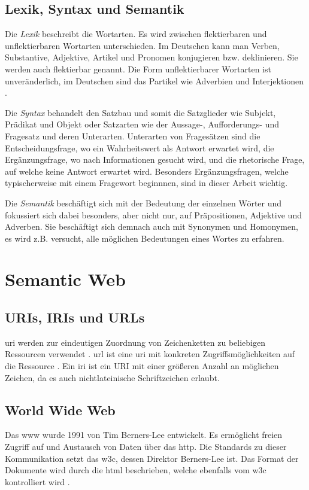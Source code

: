 \subsection{Lexik, Syntax und Semantik}
Die \emph{Lexik} beschreibt die Wortarten.
Es wird zwischen flektierbaren und unflektierbaren Wortarten unterschieden.
Im Deutschen kann man Verben, Substantive, Adjektive, Artikel und Pronomen konjugieren bzw. deklinieren.
Sie werden auch flektierbar genannt.
Die Form unflektierbarer Wortarten ist unveränderlich, im Deutschen sind das Partikel wie Adverbien und Interjektionen \citep[S.~505]{deutschbuch}.

Die \emph{Syntax} behandelt den Satzbau und somit die Satzglieder wie Subjekt, Prädikat und Objekt oder Satzarten wie der Aussage-, Aufforderungs- und Fragesatz und deren Unterarten.
Unterarten von Fragesätzen sind  die Entscheidungsfrage, wo ein Wahrheitswert als Antwort erwartet wird, die Ergänzungsfrage, wo nach Informationen gesucht wird, und die rhetorische Frage, auf welche keine Antwort erwartet wird.
Besonders Ergänzungsfragen, welche typischerweise mit einem Fragewort beginnnen, sind in dieser Arbeit wichtig.

Die \emph{Semantik} beschäftigt sich mit der Bedeutung der einzelnen Wörter und fokussiert sich dabei besonders, aber nicht nur, auf Präpositionen, Adjektive und Adverben.
Sie beschäftigt sich demnach auch mit Synonymen und Homonymen, es wird z.B. versucht, alle möglichen Bedeutungen eines Wortes zu erfahren.

\section{Semantic Web}

\subsection{URIs, IRIs und URLs}
\ac{uri} werden zur eindeutigen Zuordnung von Zeichenketten zu beliebigen Ressourcen verwendet \citep{uri}.
\ac{url} ist eine \ac{uri} mit konkreten Zugriffsmöglichkeiten auf die Ressource \citep{url}.
Ein \ac{iri} ist ein URI mit einer größeren Anzahl an möglichen Zeichen, da es auch nichtlateinische Schriftzeichen erlaubt.

\subsection{World Wide Web}
Das \ac{www} wurde 1991 von Tim Berners-Lee entwickelt.
Es ermöglicht freien Zugriff auf und Austausch von Daten über das \ac{http}.
Die Standards zu dieser Kommunikation setzt das \ac{w3c}, dessen Direktor Berners-Lee ist.
Das Format der Dokumente wird durch die \ac{html} beschrieben, welche ebenfalls vom \ac{w3c} kontrolliert wird \citep{www}.

